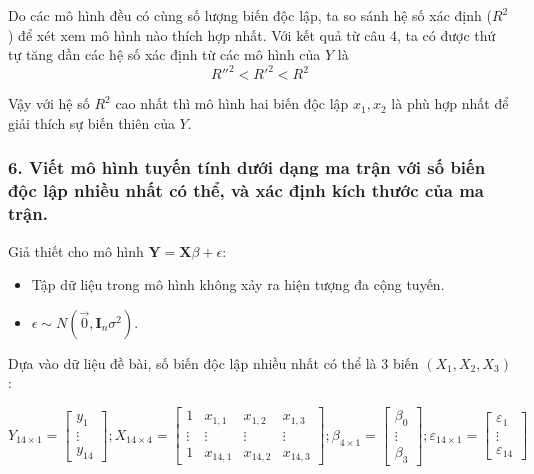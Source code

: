 \documentclass[a4paper]{article}
\theoremstyle{nonumberplain}
\begin{document}
Do các mô hình đều có cùng số lượng biến độc lập, ta so sánh hệ số xác định ($R^2$) để xét xem mô hình nào thích hợp nhất. Với kết quả từ câu 4, ta có được thứ tự tăng dần các hệ số xác định từ các mô hình của $Y$ là \[R''^2 < R'^2 < R^2 \]

Vậy với hệ số $R^2$ cao nhất thì mô hình hai biến độc lập $x_1, x_2$ là phù hợp nhất để giải thích sự biến thiên của $Y$.

\subsubsection*{6. Viết mô hình tuyến tính dưới dạng ma trận với số biến độc lập nhiều nhất có thể, và xác định kích thước của ma trận.}

Giả thiết cho mô hình $\mathbf{Y} = \mathbf{X}\beta + \epsilon$:
\begin{itemize}
	\item Tập dữ liệu trong mô hình không xảy ra hiện tượng đa cộng tuyến.
	\item $\epsilon \sim N(\vec{0},\mathbf{I}_n \sigma^2)$.
\end{itemize}

Dựa vào dữ liệu đề bài, số biến độc lập nhiều nhất có thể là 3 biến $(X_1,X_2,X_3)$:

\[{Y_{14 \times 1}} = \left[ {\begin{array}{*{20}{c}}
  {{y_1}} \\ 
   \vdots  \\ 
  {{y_{14}}} 
\end{array}} \right];{X_{14 \times 4}} = \left[ {\begin{array}{*{20}{c}}
  1&{{x_{1,1}}}&{{x_{1,2}}}&{{x_{1,3}}} \\ 
  \vdots & \vdots & \vdots & \vdots  \\ 
  1&{{x_{14,1}}}&{{x_{14,2}}}&{{x_{14,3}}} 
\end{array}} \right];{\beta _{4 \times 1}} = \left[ {\begin{array}{*{20}{c}}
  {{\beta _0}} \\ 
   \vdots  \\ 
  {{\beta _3}} 
\end{array}} \right];{\varepsilon _{14 \times 1}} = \left[ {\begin{array}{*{20}{c}}
  {{\varepsilon _1}} \\ 
   \vdots  \\ 
  {{\varepsilon _{14}}} 
\end{array}} \right]\]
\end{document}
